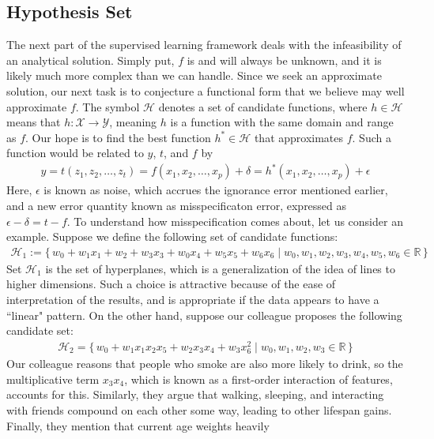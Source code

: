 \documentclass[12pt]{article}
\begin{document}
	\subsection{Hypothesis Set}
	The next part of the supervised learning framework deals with the
	infeasibility of an analytical solution. Simply put, $f$ is and will
	always be unknown, and it is likely much more complex than we can handle.
	Since we seek an approximate solution, our next task is to conjecture a
	functional form that we believe may well approximate $f$. The symbol
	$\mathcal{H}$ denotes a set of candidate functions, where $h\in \mathcal{H}$
	means that $h:\mathcal{X}\to\mathcal{Y}$, meaning $h$ is a function with
	the same domain and range as $f$. Our hope is to find the best function
	$h^*\in \mathcal{H}$ that approximates $f$. Such a function would be related
	to $y$, $t$, and $f$ by
	\begin{align*}
		y
		=t(z_1,z_2,\ldots,z_t)
		=f(x_1,x_2,\ldots,x_p) + \delta
		=h^*(x_1,x_2,\ldots,x_p) + \epsilon
	\end{align*}
	Here, $\epsilon$ is known as noise, which accrues the ignorance error mentioned
	earlier, and a new error quantity known as misspecificaton error, expressed as
	$\epsilon-\delta = t-f$. To understand how misspecification comes about, let us
	consider an example. Suppose we define the following set of
	candidate functions:
	\begin{align*}
		\mathcal{H}_1 := \{\,
		w_0+w_1x_1+w_2+w_3x_3+w_0x_4+w_5x_5 + w_6 x_6 \mid w_0,w_1,w_2,w_3,w_4,w_5, w_6\in\mathbb{R}
		\,\}
	\end{align*}
	Set $\mathcal{H}_1$ is the set of hyperplanes, which is a generalization of
	the idea of lines to higher dimensions. Such a choice is attractive because
	of the ease of interpretation of the results, and is appropriate if the
	data appears to have a ``linear" pattern. On the other hand, suppose our
	colleague proposes the following candidate set:
	\begin{align*}
		\mathcal{H}_2 = \{\,
		w_0 + w_1x_1x_2x_5 + w_2x_3x_4 + w_3 x_6^2 \mid w_0,w_1,w_2, w_3\in \mathbb{R}
		\,\}
	\end{align*}
	Our colleague reasons that people who smoke are also more likely to drink,
	so the multiplicative term $x_3x_4$, which is known as a first-order interaction
	of features, accounts for this. Similarly, they argue that walking, sleeping,
	and interacting with friends compound on each other some way, leading to
	other lifespan gains. Finally, they mention that current age weights heavily
\end{document}
